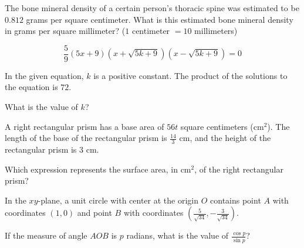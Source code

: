 \noindent\markforreview
\vspace{1em}

The bone mineral density of a certain person's thoracic spine was estimated to be \(0.812\) grams per square centimeter. What is this estimated bone mineral density in grams per square millimeter? (\(1\) centimeter \(= 10\) millimeters)

\vspace{0.75em}


\vspace{2em}
\newpage

\noindent\markforreview
\vspace{1em}

\[
\frac{5}{9}(5x + 9)\left(x + \sqrt{5k + 9}\right)\left(x - \sqrt{5k + 9}\right) = 0
\]

In the given equation, \(k\) is a positive constant. The product of the solutions to the equation is \(72\).

What is the value of \(k\)?

\vspace{2em}
\newpage

\noindent\markforreview
\vspace{1em}

A right rectangular prism has a base area of \(56t\) square centimeters (\(\text{cm}^2\)). The length of the base of the rectangular prism is \(\frac{14}{3}\) cm, and the height of the rectangular prism is \(3\) cm.

Which expression represents the surface area, in \(\text{cm}^2\), of the right rectangular prism?

\vspace{0.75em}


\vspace{2em}
\newpage

\noindent\markforreview
\vspace{1em}

In the \(xy\)-plane, a unit circle with center at the origin \(O\) contains point \(A\) with coordinates \((1, 0)\) and point \(B\) with coordinates \(\left(\frac{5}{\sqrt{34}}, -\frac{3}{\sqrt{34}}\right)\).

If the measure of angle \(AOB\) is \(p\) radians, what is the value of \(\frac{\cos p}{\sin p}\)?

